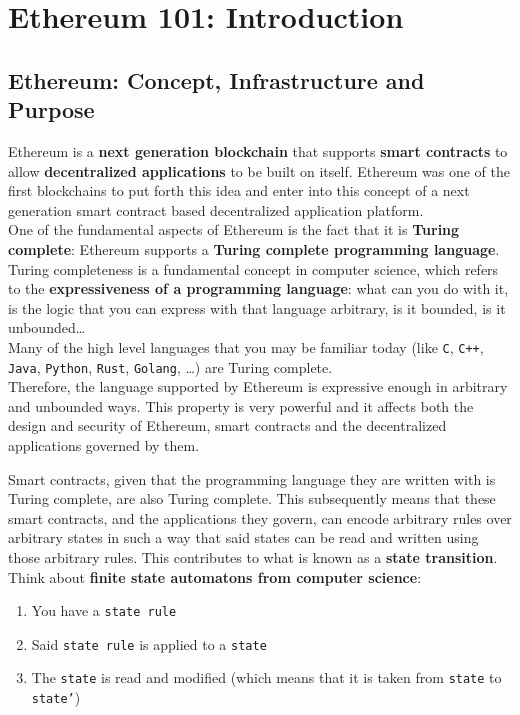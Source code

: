 \chapter{Ethereum 101: Introduction}

\section{Ethereum: Concept, Infrastructure and Purpose}

Ethereum is a \textbf{next generation blockchain} that supports \textbf{smart contracts} to allow \textbf{decentralized applications} to be built on itself.
Ethereum was one of the first blockchains to put forth this idea and enter into this concept of a next generation smart contract based decentralized application platform.\\

One of the fundamental aspects of Ethereum is the fact that it is \textbf{Turing complete}: Ethereum supports a \textbf{Turing complete programming language}.
Turing completeness is a fundamental concept in computer science, which refers to the \textbf{expressiveness of a programming language}: what can you do with it, is the logic that you can express with that language arbitrary, is it bounded, is it unbounded\dots\\

Many of the high level languages that you may be familiar today (like \texttt{C}, \texttt{C++}, \texttt{Java}, \texttt{Python}, \texttt{Rust},  \texttt{Golang}, \dots) are Turing complete.\\

Therefore, the language supported by Ethereum is expressive enough in arbitrary and unbounded ways.
This property is very powerful and it affects both the design and security of Ethereum, smart contracts and the decentralized applications governed by them.\\

\pagebreak

Smart contracts, given that the programming language they are written with is Turing complete, are also Turing complete.
This subsequently means that these smart contracts, and the applications they govern, can encode arbitrary rules over arbitrary states in such a way that said states can be read and written using those arbitrary rules.
This contributes to what is known as a \textbf{state transition}.
Think about \textbf{finite state automatons from computer science}:

\begin{enumerate}
    \item You have a \texttt{state rule}
    \item Said \texttt{state rule} is applied to a \texttt{state}
    \item The \texttt{state} is read and modified (which means that it is taken from \texttt{state} to \texttt{state'})
\end{enumerate}

